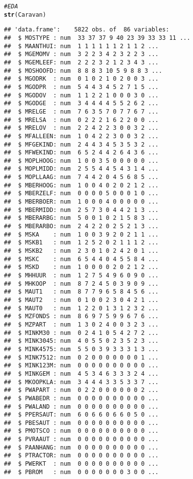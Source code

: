 \documentclass{article}\usepackage[]{graphicx}\usepackage[]{xcolor}
\makeatletter
\newcommand{\hlcom}[1]{\textcolor[rgb]{0.678,0.584,0.686}{\textit{#1}}}%
\newcommand{\hlstd}[1]{\textcolor[rgb]{0.345,0.345,0.345}{#1}}%
\newcommand{\hlkwd}[1]{\textcolor[rgb]{0.737,0.353,0.396}{\textbf{#1}}}%
\newenvironment{kframe}{%
 \def\at@end@of@kframe{}%
 \ifinner\ifhmode%
  \def\at@end@of@kframe{\end{minipage}}%
  \begin{minipage}{\columnwidth}%
 \fi\fi%
 \def\FrameCommand##1{\hskip\@totalleftmargin \hskip-\fboxsep
 \colorbox{shadecolor}{##1}\hskip-\fboxsep
     \hskip-\linewidth \hskip-\@totalleftmargin \hskip\columnwidth}%
 \MakeFramed {\advance\hsize-\width
   \@totalleftmargin\z@ \linewidth\hsize
   \@setminipage}}%
 {\par\unskip\endMakeFramed%
 \at@end@of@kframe}
\newenvironment{knitrout}{}{} %
\makeatother
\begin{document}
\begin{knitrout}
\begin{kframe}
\begin{alltt}
\hlcom{# EDA}
\hlkwd{str}\hlstd{(Caravan)}
\end{alltt}
\begin{verbatim}
## 'data.frame':	5822 obs. of  86 variables:
##  $ MOSTYPE : num  33 37 37 9 40 23 39 33 33 11 ...
##  $ MAANTHUI: num  1 1 1 1 1 1 2 1 1 2 ...
##  $ MGEMOMV : num  3 2 2 3 4 2 3 2 2 3 ...
##  $ MGEMLEEF: num  2 2 2 3 2 1 2 3 4 3 ...
##  $ MOSHOOFD: num  8 8 8 3 10 5 9 8 8 3 ...
##  $ MGODRK  : num  0 1 0 2 1 0 2 0 0 3 ...
##  $ MGODPR  : num  5 4 4 3 4 5 2 7 1 5 ...
##  $ MGODOV  : num  1 1 2 2 1 0 0 0 3 0 ...
##  $ MGODGE  : num  3 4 4 4 4 5 5 2 6 2 ...
##  $ MRELGE  : num  7 6 3 5 7 0 7 7 6 7 ...
##  $ MRELSA  : num  0 2 2 2 1 6 2 2 0 0 ...
##  $ MRELOV  : num  2 2 4 2 2 3 0 0 3 2 ...
##  $ MFALLEEN: num  1 0 4 2 2 3 0 0 3 2 ...
##  $ MFGEKIND: num  2 4 4 3 4 5 3 5 3 2 ...
##  $ MFWEKIND: num  6 5 2 4 4 2 6 4 3 6 ...
##  $ MOPLHOOG: num  1 0 0 3 5 0 0 0 0 0 ...
##  $ MOPLMIDD: num  2 5 5 4 4 5 4 3 1 4 ...
##  $ MOPLLAAG: num  7 4 4 2 0 4 5 6 8 5 ...
##  $ MBERHOOG: num  1 0 0 4 0 2 0 2 1 2 ...
##  $ MBERZELF: num  0 0 0 0 5 0 0 0 1 0 ...
##  $ MBERBOER: num  1 0 0 0 4 0 0 0 0 0 ...
##  $ MBERMIDD: num  2 5 7 3 0 4 4 2 1 3 ...
##  $ MBERARBG: num  5 0 0 1 0 2 1 5 8 3 ...
##  $ MBERARBO: num  2 4 2 2 0 2 5 2 1 3 ...
##  $ MSKA    : num  1 0 0 3 9 2 0 2 1 1 ...
##  $ MSKB1   : num  1 2 5 2 0 2 1 1 1 2 ...
##  $ MSKB2   : num  2 3 0 1 0 2 4 2 0 1 ...
##  $ MSKC    : num  6 5 4 4 0 4 5 5 8 4 ...
##  $ MSKD    : num  1 0 0 0 0 2 0 2 1 2 ...
##  $ MHHUUR  : num  1 2 7 5 4 9 6 0 9 0 ...
##  $ MHKOOP  : num  8 7 2 4 5 0 3 9 0 9 ...
##  $ MAUT1   : num  8 7 7 9 6 5 8 4 5 6 ...
##  $ MAUT2   : num  0 1 0 0 2 3 0 4 2 1 ...
##  $ MAUT0   : num  1 2 2 0 1 3 1 2 3 2 ...
##  $ MZFONDS : num  8 6 9 7 5 9 9 6 7 6 ...
##  $ MZPART  : num  1 3 0 2 4 0 0 3 2 3 ...
##  $ MINKM30 : num  0 2 4 1 0 5 4 2 7 2 ...
##  $ MINK3045: num  4 0 5 5 0 2 3 5 2 3 ...
##  $ MINK4575: num  5 5 0 3 9 3 3 3 1 3 ...
##  $ MINK7512: num  0 2 0 0 0 0 0 0 0 1 ...
##  $ MINK123M: num  0 0 0 0 0 0 0 0 0 0 ...
##  $ MINKGEM : num  4 5 3 4 6 3 3 3 2 4 ...
##  $ MKOOPKLA: num  3 4 4 4 3 3 5 3 3 7 ...
##  $ PWAPART : num  0 2 2 0 0 0 0 0 0 2 ...
##  $ PWABEDR : num  0 0 0 0 0 0 0 0 0 0 ...
##  $ PWALAND : num  0 0 0 0 0 0 0 0 0 0 ...
##  $ PPERSAUT: num  6 0 6 6 0 6 6 0 5 0 ...
##  $ PBESAUT : num  0 0 0 0 0 0 0 0 0 0 ...
##  $ PMOTSCO : num  0 0 0 0 0 0 0 0 0 0 ...
##  $ PVRAAUT : num  0 0 0 0 0 0 0 0 0 0 ...
##  $ PAANHANG: num  0 0 0 0 0 0 0 0 0 0 ...
##  $ PTRACTOR: num  0 0 0 0 0 0 0 0 0 0 ...
##  $ PWERKT  : num  0 0 0 0 0 0 0 0 0 0 ...
##  $ PBROM   : num  0 0 0 0 0 0 0 3 0 0 ...

\end{verbatim}
\end{kframe}
\end{knitrout}
\end{document}
